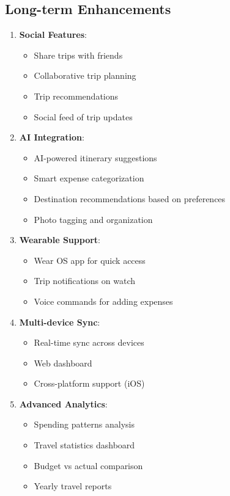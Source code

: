 \documentclass[12pt,a4paper]{article}
\begin{document}
\subsection{Long-term Enhancements}
\begin{enumerate}
    \item \textbf{Social Features}:
    \begin{itemize}
        \item Share trips with friends
        \item Collaborative trip planning
        \item Trip recommendations
        \item Social feed of trip updates
    \end{itemize}

    \item \textbf{AI Integration}:
    \begin{itemize}
        \item AI-powered itinerary suggestions
        \item Smart expense categorization
        \item Destination recommendations based on preferences
        \item Photo tagging and organization
    \end{itemize}

    \item \textbf{Wearable Support}:
    \begin{itemize}
        \item Wear OS app for quick access
        \item Trip notifications on watch
        \item Voice commands for adding expenses
    \end{itemize}

    \item \textbf{Multi-device Sync}:
    \begin{itemize}
        \item Real-time sync across devices
        \item Web dashboard
        \item Cross-platform support (iOS)
    \end{itemize}

    \item \textbf{Advanced Analytics}:
    \begin{itemize}
        \item Spending patterns analysis
        \item Travel statistics dashboard
        \item Budget vs actual comparison
        \item Yearly travel reports
    \end{itemize}
\end{enumerate}
\end{document}

